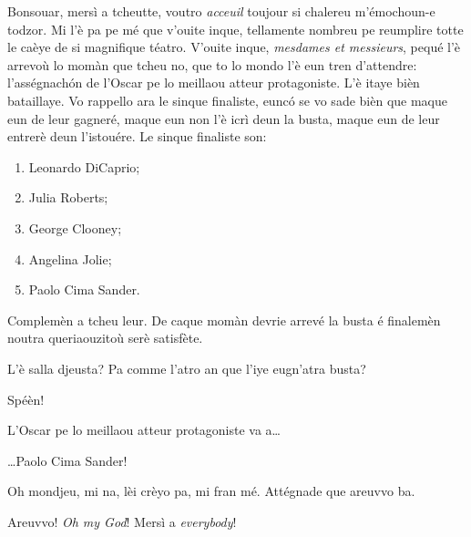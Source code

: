 \begin{drama}
\Conducteurspeaks Bonsouar, mersì a tcheutte, voutro \textit{acceuil} toujour si chalereu m'émochoun-e todzor. Mi l'è pa pe mé que v'ouite inque, tellamente nombreu pe reumplire totte le caèye de si magnifique téatro. V'ouite inque, \textit{mesdames et messieurs}, pequé l'è arrevoù lo momàn que tcheu no, que to lo mondo l'è eun tren d'attendre: l'asségnach\'on de l'Oscar pe lo meillaou atteur protagoniste. L'è itaye bièn bataillaye. Vo rappello ara le sinque finaliste, euncó se vo sade bièn que maque eun de leur gagneré, maque eun non l'è icrì deun la busta, maque eun de leur entrerè deun l'istouére. Le sinque finaliste son:
\begin{enumerate}
\item Leonardo DiCaprio;
\item Julia Roberts;
\item George Clooney;
\item Angelina Jolie;
\item Paolo Cima Sander.
\end{enumerate}

Complemèn a tcheu leur. De caque momàn devrie arrevé la busta é finalemèn noutra queriaouzitoù serè satisfète.


\Conducteurspeaks{} L'è salla djeusta? Pa comme l'atro an que l'iye eugn'atra busta?

\Vallettaspeaks Spéèn!

\Conducteurspeaks L'Oscar pe lo meillaou atteur protagoniste va a\ldots


\Conducteurspeaks \ldots Paolo Cima Sander!


\Cimaspeaks{} Oh mondjeu, mi na, lèi crèyo pa, mi fran mé. Attégnade que areuvvo ba. 

\label{katchi}


\Cimaspeaks Areuvvo! \textit{Oh my God}! Mersì a \textit{everybody}!


\end{drama}
